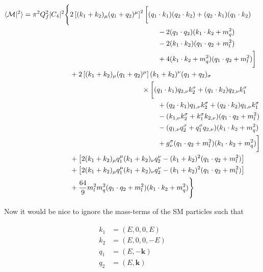 \documentclass[11pt,a4paper]{article}
\begin{document}
\begin{align}
	\begin{split}
	\langle\mathcal{M}|^2\rangle = \pi^2Q_f^2|C_4|^2\Bigg\{ &2\left[(k_1+k_2)_\mu(q_1+q_2)^\mu\right]^2\bigg[ (q_1\cdot k_1)(q_2\cdot k_2) +(q_2\cdot k_1)(q_1\cdot k_2)\\
	&\hspace{4.4cm}- 2(q_1\cdot q_2)(k_1\cdot k_2 + m_q^2) \\
	&\hspace{4.4cm}- 2(k_1\cdot k_2)(q_1\cdot q_2 + m_l^2)\\
	&\hspace{4.4cm} + 4(k_1\cdot k_2 + m_q^2)(q_1\cdot q_2 + m_l^2)\bigg]\\
	&+ 2\left[(k_1+k_2)_\mu(q_1+q_2)^\mu\right](k_1+k_2)^\nu(q_1+q_2)_\sigma\\
	&\hspace{3.6cm}\times\bigg[ (q_1\cdot k_1)q_{2,\nu}k_2^\sigma + (q_1\cdot k_2)q_{2,\nu}k_1^\sigma\\
	&\hspace{4.4cm}+(q_2\cdot k_1)q_{1,\nu}k_2^\sigma + (q_2\cdot k_2)q_{1,\nu}k_1^\sigma\\
	&\hspace{4.4cm} -(k_{1,\nu}k_2^\sigma + k_1^\sigma k_{2,\nu})(q_1\cdot q_2 + m_l^2)\\
	&\hspace{4.4cm} -(q_{1,\nu}q_2^\sigma + q_1^\sigma q_{2,\nu})(k_1\cdot k_2 + m_q^2)\\
	&\hspace{4.4cm} +g_\nu^\sigma(q_1\cdot q_2 + m_l^2)(k_1\cdot k_2 + m_q^2) \bigg]\\
	&+\left[2(k_1+k_2)_\mu q_1^\mu (k_1+k_2)_\nu q_2^\nu - (k_1+k_2)^2(q_1\cdot q_2 + m_l^2)\right]\\
	&+\left[2(k_1+k_2)_\mu q_1^\mu (k_1+k_2)_\nu q_2^\nu - (k_1+k_2)^2(q_1\cdot q_2 + m_l^2)\right]\\
	&+\frac{64}{9}m_l^2m_q^2(q_1\cdot q_2 + m_l^2)(k_1\cdot k_2 + m_q^2)\Bigg\}
	\end{split}
	\label{eq_ffs}
\end{align}

Now it would be nice to ignore the mass-terms of the SM particles such that

\begin{align}
	\begin{split}
	k_1 &= (E,0,0,E)\\
	k_2 &= (E,0,0,-E)\\
	q_1 &= (E,-\bm{k})\\
	q_2 &= (E,\bm{k})
	\end{split}
\end{align}
\end{document}
